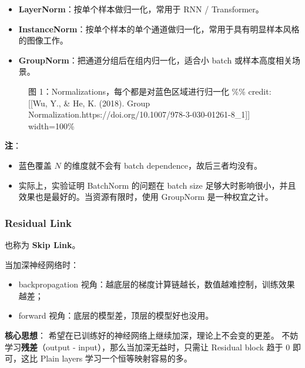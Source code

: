 \begin{itemize}
\tightlist
\item
  \textbf{LayerNorm}：按单个样本做归一化，常用于 RNN / Transformer。
\item
  \textbf{InstanceNorm}：按单个样本的单个通道做归一化，常用于具有明显样本风格的图像工作。
\item
  \textbf{GroupNorm}：把通道分组后在组内归一化，适合小 batch
  或样本高度相关场景。
\end{itemize}

\begin{figure}
\centering
{}
\caption{图 1：Normalizations，每个都是对蓝色区域进行归一化 \%\% credit:
{[}{[}Wu, Y., \& He, K. (2018). Group
Normalization.\textbar https://doi.org/10.1007/978-3-030-01261-8\_1{]}{]}
\textbar{} width=100\%}
\end{figure}

\textbf{注}：

\begin{itemize}
\tightlist
\item
  蓝色覆盖 \(N\) 的维度就不会有 batch dependence，故后三者均没有。
\item
  实际上，实验证明 BatchNorm 的问题在 batch size
  足够大时影响很小，并且效果也是最好的。当资源有限时，使用 GroupNorm
  是一种权宜之计。
\end{itemize}

\subsubsection{Residual Link}\label{residual-link}

也称为 \textbf{Skip Link}。

当加深神经网络时：

\begin{itemize}
\tightlist
\item
  backpropagation
  视角：越底层的梯度计算链越长，数值越难控制，训练效果越差；
\item
  forward 视角：底层的模型差，顶层的模型好也没用。
\end{itemize}

\textbf{核心思想}：
希望在已训练好的神经网络上继续加深，理论上不会变的更差。
不妨学习\textbf{残差}（output - input），那么当加深无益时，只需让
Residual block 趋于 0 即可，这比 Plain layers 学习一个恒等映射容易的多。

